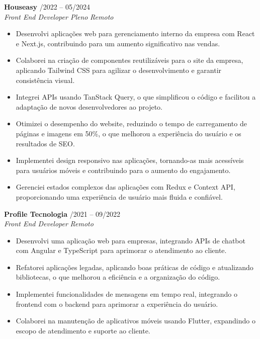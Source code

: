 \documentclass[a4paper,10pt]{article}
\newcommand{\entry}[4]{
  \noindent\textbf{#1} \hfill #2 \\
  \noindent\textit{#3} \hfill \textit{#4} \\
  \vspace{2pt}
}
\begin{document}
\entry{Houseasy}{ /2022 -- 05/2024}
{Front End Developer Pleno}{Remoto}
\vspace{-1.6em}
\begin{itemize}
\setlength\itemsep{-0.3em}

\item Desenvolvi aplicações web para gerenciamento interno da empresa com React e Next.js, contribuindo para um aumento significativo nas vendas.
\item Colaborei na criação de componentes reutilizáveis para o site da empresa, aplicando Tailwind CSS para agilizar o desenvolvimento e garantir consistência visual.
\item Integrei APIs usando TanStack Query, o que simplificou o código e facilitou a adaptação de novos desenvolvedores ao projeto.
\item Otimizei o desempenho do website, reduzindo o tempo de carregamento de páginas e imagens em 50\%, o que melhorou a experiência do usuário e os resultados de SEO.
\item Implementei design responsivo nas aplicações, tornando-as mais acessíveis para usuários móveis e contribuindo para o aumento do engajamento.
\item Gerenciei estados complexos das aplicações com Redux e Context API, proporcionando uma experiência de usuário mais fluida e confiável.

\end{itemize}

\entry{Profile Tecnologia}{ /2021 -- 09/2022}
{Front End Developer}{Remoto}
\vspace{-1.6em}
\begin{itemize}
\setlength\itemsep{-0.3em}

\item Desenvolvi uma aplicação web para empresas, integrando APIs de chatbot com Angular e TypeScript para aprimorar o atendimento ao cliente.

\item Refatorei aplicações legadas, aplicando boas práticas de código e atualizando bibliotecas, o que melhorou a eficiência e a organização do código.

\item Implementei funcionalidades de mensagens em tempo real, integrando o frontend com o backend para aprimorar a experiência do usuário.

\item Colaborei na manutenção de aplicativos móveis usando Flutter, expandindo o escopo de atendimento e suporte ao cliente.

\end{itemize}
\end{document}
